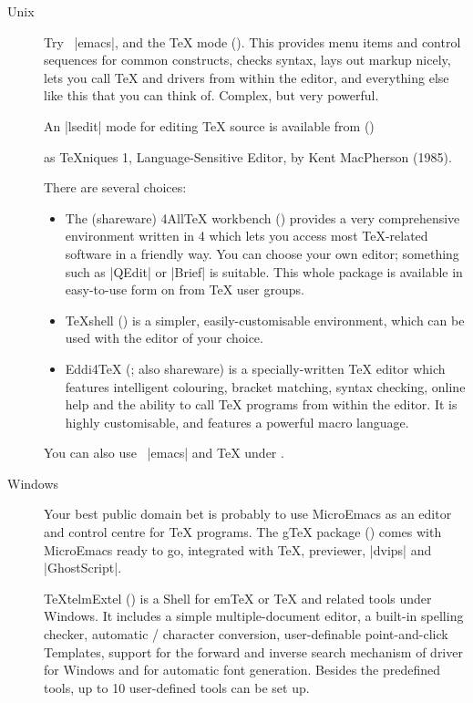 \begin{description}
\item[Unix] Try ~\ProgName|emacs|, and the \TeX{} mode
  ().  This provides menu items and control sequences
  for common constructs, checks syntax, lays out markup nicely, lets
  you call \TeX{} and drivers from within the editor, and everything
  else like this that you can think of.  Complex, but very powerful.
\item[] An \ProgName|lsedit| mode for editing \TeX{} source is
  available from
  \htmlignore
   ()
  \endhtmlignore
\begin{htmlversion}
\end{htmlversion}
  as \TeX{}niques 1,  Language-Sensitive Editor, by Kent MacPherson
  (1985).
\item[\MSDOS{}] There are several choices:
  \begin{itemize}
  \item The (shareware) 4All\TeX{} workbench ()
    provides a very
    comprehensive environment written in 4 which lets you
    access most \TeX{}-related
    software in a friendly way. You can choose your own editor;
    something such as \ProgName|QEdit| or \ProgName|Brief| is
    suitable. This whole package is available in easy-to-use form on
    \CDROM{} from \TeX{} user groups.
  \item \TeX{}shell () is a simpler,
    easily-customisable environment, which can be used with the editor
    of your choice.
  \item Eddi4\TeX{} (; also shareware) is a
    specially-written \TeX{}
    editor which features intelligent colouring, bracket matching,
    syntax checking, online help and the ability to call \TeX{}
    programs from within the editor. It is highly customisable, and
    features a powerful macro language.
  \end{itemize}
  You can also use ~\ProgName|emacs| and \TeX{}
  under \MSDOS{}.
\item[Windows] Your best public domain bet is probably to use
  MicroEmacs as an editor and control centre for \TeX{} programs. The
  g\TeX{} package () comes with MicroEmacs ready to go,
  integrated with \TeX{}, previewer, \ProgName|dvips| and
  \ProgName|GhostScript|.

  \TeX{}telmExtel () is a Shell for em\TeX{} or
  \TeX{} and related tools under Windows.  It includes a
  simple multiple-document editor, a built-in spelling checker,
  automatic / character conversion,
  user-definable point-and-click Templates, support for the forward
  and inverse search mechanism of  driver for Windows and
  for automatic font generation.  Besides the predefined tools, up to
  10 user-defined tools can be set up.


\end{description}
